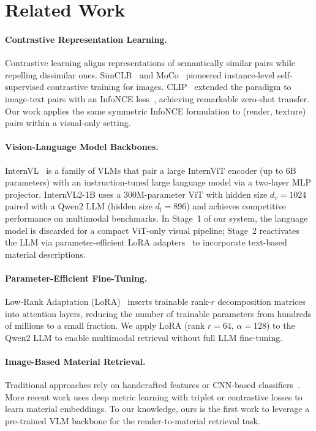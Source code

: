\documentclass[10pt,twocolumn]{article}
\begin{document}
\section{Related Work}

\paragraph{Contrastive Representation Learning.}
Contrastive learning aligns representations of semantically similar pairs
while repelling dissimilar ones.
SimCLR~\cite{chen2020simclr} and MoCo~\cite{he2020moco} pioneered
instance-level self-supervised contrastive training for images.
CLIP~\cite{radford2021clip} extended the paradigm to image-text pairs with an
InfoNCE loss~\cite{oord2018infonce}, achieving remarkable zero-shot transfer.
Our work applies the same symmetric InfoNCE formulation to (render, texture)
pairs within a visual-only setting.

\paragraph{Vision-Language Model Backbones.}
InternVL~\cite{chen2024internvl} is a family of VLMs that pair a large
InternViT encoder (up to 6B parameters) with an instruction-tuned large
language model via a two-layer MLP projector.
InternVL2-1B uses a 300M-parameter ViT with hidden size $d_v=1024$ paired
with a Qwen2 LLM (hidden size $d_l=896$) and achieves competitive performance
on multimodal benchmarks.
In Stage~1 of our system, the language model is discarded for a compact
ViT-only visual pipeline; Stage~2 reactivates the LLM via parameter-efficient
LoRA adapters~\cite{hu2022lora} to incorporate text-based material
descriptions.

\paragraph{Parameter-Efficient Fine-Tuning.}
Low-Rank Adaptation (LoRA)~\cite{hu2022lora} inserts trainable rank-$r$
decomposition matrices into attention layers, reducing the number of
trainable parameters from hundreds of millions to a small fraction.
We apply LoRA (rank $r=64$, $\alpha=128$) to the Qwen2 LLM to enable
multimodal retrieval without full LLM fine-tuning.

\paragraph{Image-Based Material Retrieval.}
Traditional approaches rely on handcrafted features
or CNN-based classifiers~\cite{bell2015material}.
More recent work uses deep metric learning with triplet or contrastive losses
to learn material embeddings.
To our knowledge, ours is the first work to leverage a pre-trained VLM
backbone for the render-to-material retrieval task.
\end{document}
